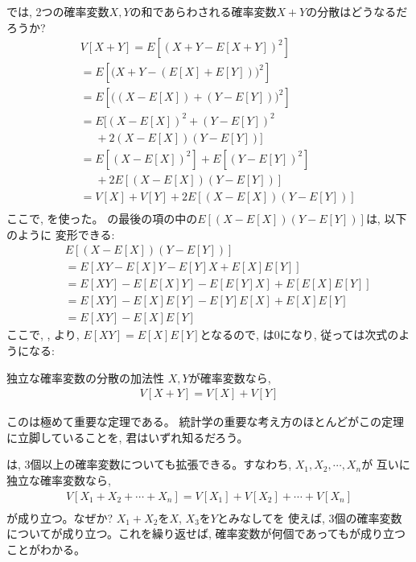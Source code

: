 では, 2つの確率変数$X, Y$の和であらわされる確率変数$X+Y$の分散はどうなるだろうか?
\begin{eqnarray}
&&V[X+Y]=E[(X+Y-E[X+Y])^2]\nonumber\\
&&=E[\bigl(X+Y-(E[X]+E[Y])\bigr)^2]\nonumber\\
&&=E[\bigl((X-E[X])+(Y-E[Y])\bigr)^2]\nonumber\\
&&=E[(X-E[X])^2+(Y-E[Y])^2\nonumber\\
&&\,\,\,\,\,\,\,\,+2(X-E[X])(Y-E[Y])]\nonumber\\
&&=E[(X-E[X])^2]+E[(Y-E[Y])^2]\nonumber\\
&&\,\,\,\,\,\,\,\,+2E[(X-E[X])(Y-E[Y])]\nonumber\\
&&=V[X]+V[Y]+2E[(X-E[X])(Y-E[Y])]\nonumber\\
\label{eq:V_X_Y_2}
\end{eqnarray}
ここで, を使った。
の最後の項の中の$E[(X-E[X])(Y-E[Y])]$は, 以下のように
変形できる:
\begin{eqnarray}
&&E[(X-E[X])(Y-E[Y])]\nonumber\\
&&=E[XY-E[X]Y-E[Y]X+E[X]E[Y]]\nonumber\\
&&=E[XY]-E[E[X]Y]-E[E[Y]X]+E[E[X]E[Y]]\nonumber\\
&&=E[XY]-E[X]E[Y]-E[Y]E[X]+E[X]E[Y]\nonumber\\
&&=E[XY]-E[X]E[Y]\label{eq:stochas_cov00}
\end{eqnarray}
ここで, , より, 
$E[XY]=E[X]E[Y]$となるので, は0になり, 従っては次式のようになる:
\begin{itembox}{独立な確率変数の分散の加法性}
$X, Y$が確率変数なら, 
\begin{eqnarray}
V[X+Y]=V[X]+V[Y]\label{eq:V_X_Y_4}
\end{eqnarray}
\end{itembox}

このは極めて重要な定理である。
統計学の重要な考え方のほとんどがこの定理に立脚していることを, 君はいずれ知るだろう。

は, 3個以上の確率変数についても拡張できる。すなわち, $X_1, X_2, \cdots, X_n$が
互いに独立な確率変数なら, 
\begin{eqnarray}
V[X_1+X_2+\cdots+X_n]=V[X_1]+V[X_2]+\cdots+V[X_n]\nonumber\\
\label{eq:V_X_Y_n}
\end{eqnarray}
が成り立つ。なぜか? $X_1+X_2$を$X$, $X_3$を$Y$とみなしてを
使えば, 3個の確率変数についてが成り立つ。これを繰り返せば, 
確率変数が何個であってもが成り立つことがわかる。\\

